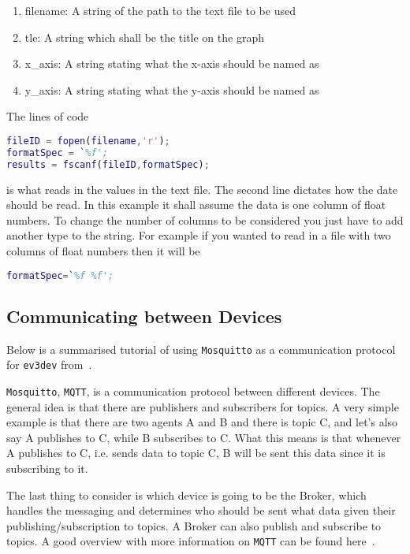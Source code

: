 \documentclass{article}
\begin{document}
\begin{enumerate}
    \item filename: A string of the path to the text file to be used
    \item tle: A string which shall be the title on the graph
    \item x\_axis: A string stating what the x-axis should be named as
    \item y\_axis: A string stating what the y-axis should be named as
\end{enumerate}

The lines of code

\begin{lstlisting}[language=Matlab]
fileID = fopen(filename,'r');
formatSpec = `%f';
results = fscanf(fileID,formatSpec);
\end{lstlisting}

is what reads in the values in the text file. The second line dictates how the date should be read. In this example it shall assume the data is one column of float numbers. To change the number of columns to be considered you just have to add another type to the string. For example if you wanted to read in a file with two columns of float numbers then it will be

\begin{lstlisting}[language=Matlab]
formatSpec=`%f %f';
\end{lstlisting}

\subsection{Communicating between Devices}
Below is a summarised tutorial of using \texttt{Mosquitto} as a communication protocol for \texttt{ev3dev} from~\cite{mqttTutorial}.

\texttt{Mosquitto}, \texttt{MQTT}, is a communication protocol between different devices. The general idea is that there are publishers and subscribers for topics. A very simple example is that there are two agents A and B and there is topic C, and let's also say A publishes to C, while B subscribes to C. What this means is that whenever A publishes to C, i.e. sends data to topic C, B will be sent this data since it is subscribing to it. 

The last thing to consider is which device is going to be the Broker, which handles the messaging and determines who should be sent what data given their publishing/subscription to topics. A Broker can also publish and subscribe to topics. A good overview with more information on \texttt{MQTT} can be found here~\cite{mqtt}.
\end{document}
